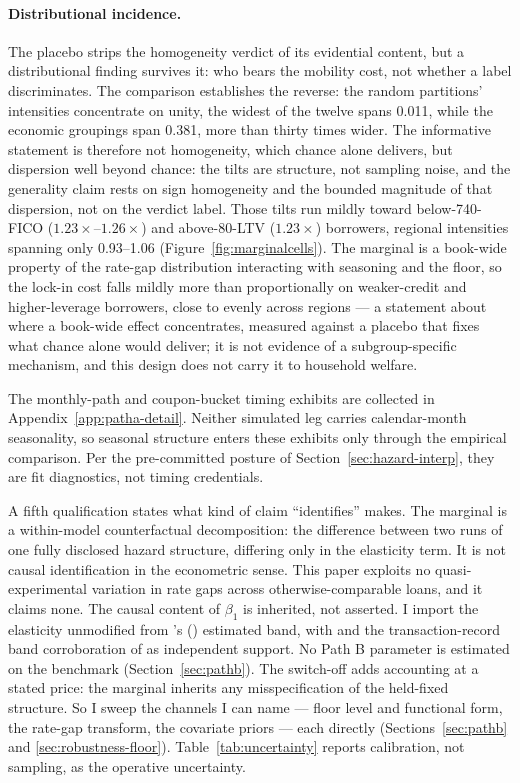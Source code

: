 \documentclass[12pt]{article}
\newcommand{\citepos}[1]{\citeauthor{#1}'s (\citeyear{#1})}
\begin{document}
\paragraph{Distributional incidence.} The placebo strips the homogeneity verdict of its evidential content, but a distributional finding survives it: who bears the mobility cost, not whether a label discriminates. The comparison establishes the reverse: the random partitions' intensities concentrate on unity, the widest of the twelve spans 0.011, while the economic groupings span 0.381, more than thirty times wider. The informative statement is therefore not homogeneity, which chance alone delivers, but dispersion well beyond chance: the tilts are structure, not sampling noise, and the generality claim rests on sign homogeneity and the bounded magnitude of that dispersion, not on the verdict label. Those tilts run mildly toward below-740-FICO ($1.23\times$--$1.26\times$) and above-80-LTV ($1.23\times$) borrowers, regional intensities spanning only 0.93--1.06 (Figure~\ref{fig:marginalcells}). The marginal is a book-wide property of the rate-gap distribution interacting with seasoning and the floor, so the lock-in cost falls mildly more than proportionally on weaker-credit and higher-leverage borrowers, close to evenly across regions --- a statement about where a book-wide effect concentrates, measured against a placebo that fixes what chance alone would deliver; it is not evidence of a subgroup-specific mechanism, and this design does not carry it to household welfare.

The monthly-path and coupon-bucket timing exhibits are collected in Appendix~\ref{app:patha-detail}. Neither simulated leg carries calendar-month seasonality, so seasonal structure enters these exhibits only through the empirical comparison. Per the pre-committed posture of Section~\ref{sec:hazard-interp}, they are fit diagnostics, not timing credentials.

A fifth qualification states what kind of claim ``identifies'' makes. The marginal is a within-model counterfactual decomposition: the difference between two runs of one fully disclosed hazard structure, differing only in the elasticity term. It is not causal identification in the econometric sense. This paper exploits no quasi-experimental variation in rate gaps across otherwise-comparable loans, and it claims none. The causal content of $\beta_1$ is inherited, not asserted. I import the elasticity unmodified from \citepos{liebersohn2024} estimated band, with \citet{fonseca2024} and the transaction-record band corroboration of \citet{graybill2026} as independent support. No Path B parameter is estimated on the benchmark (Section~\ref{sec:pathb}). The switch-off adds accounting at a stated price: the marginal inherits any misspecification of the held-fixed structure. So I sweep the channels I can name --- floor level and functional form, the rate-gap transform, the covariate priors --- each directly (Sections~\ref{sec:pathb} and \ref{sec:robustness-floor}). Table~\ref{tab:uncertainty} reports calibration, not sampling, as the operative uncertainty.
\end{document}

